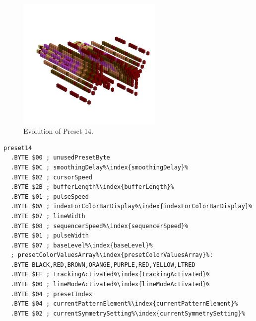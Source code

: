 \begin{minipage}[b]{0.48\linewidth}


                                                                 
\begin{figure}[H]                                                          
  \centering                                                             
  \begin{adjustbox}{width=7cm,center}                                   
  \includegraphics[width=7cm]{src/presets/pattern14-45.png}%
  \end{adjustbox}                                                        
\caption{Evolution of Preset 14.}                                           
\end{figure}                                                               
                                                                 
                                                                           
\end{minipage}
\hspace{0.1cm}
\begin{minipage}[b]{0.48\linewidth}                                       
\begin{lstlisting}[basicstyle=\ttfamily\scriptsize,caption=Data structure for Preset 14.,escapechar=\%]
preset14
  .BYTE $00 ; unusedPresetByte
  .BYTE $0C ; smoothingDelay%\index{smoothingDelay}%
  .BYTE $02 ; cursorSpeed
  .BYTE $2B ; bufferLength%\index{bufferLength}%
  .BYTE $01 ; pulseSpeed
  .BYTE $0A ; indexForColorBarDisplay%\index{indexForColorBarDisplay}%
  .BYTE $07 ; lineWidth
  .BYTE $08 ; sequencerSpeed%\index{sequencerSpeed}%
  .BYTE $01 ; pulseWidth
  .BYTE $07 ; baseLevel%\index{baseLevel}%
  ; presetColorValuesArray%\index{presetColorValuesArray}%: 
  .BYTE BLACK,RED,BROWN,ORANGE,PURPLE,RED,YELLOW,LTRED
  .BYTE $FF ; trackingActivated%\index{trackingActivated}%
  .BYTE $00 ; lineModeActivated%\index{lineModeActivated}%
  .BYTE $04 ; presetIndex
  .BYTE $04 ; currentPatternElement%\index{currentPatternElement}%
  .BYTE $02 ; currentSymmetrySetting%\index{currentSymmetrySetting}%
\end{lstlisting}
\end{minipage}

